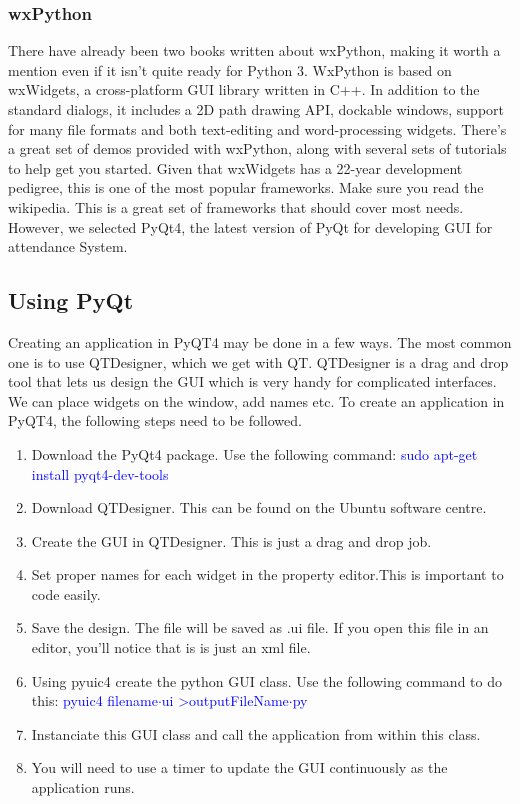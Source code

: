 \documentclass[a4paper,12pt]{article}
\begin{document}
\subsubsection*{wxPython}
There have already been two books written about wxPython, making it worth a mention even if it isn’t quite ready for Python 3.
WxPython is based on wxWidgets, a cross-platform GUI library written in C++. In addition to the standard dialogs, it includes a 
2D path drawing API, dockable windows, support for many file formats and both text-editing and word-processing widgets.
There’s a great set of demos provided with wxPython, along with several sets of tutorials to help get you started. Given that 
wxWidgets has a 22-year development pedigree, this is one of the most popular frameworks. Make sure you read the wikipedia.
This is a great set of frameworks that should cover most needs. However, we selected PyQt4, the latest version of PyQt for 
developing GUI for attendance System.

\subsection{Using PyQt}
Creating an application in PyQT4 may be done in a few ways. The most common one is to use QTDesigner, which we get with QT. 
QTDesigner is a drag and drop tool that lets us design the GUI which is very handy for complicated interfaces. We can place widgets on 
the window, add names etc. To create an application in PyQT4, the following steps need to be followed.


\begin{enumerate}
	\item Download the PyQt4 package. Use the following command:
	 \newline \textcolor{blue}{sudo apt-get install pyqt4-dev-tools}
	\item Download QTDesigner. This can be found on the Ubuntu software centre.
	\item Create the GUI in QTDesigner. This is just a drag and drop job.   
	\item Set proper names for each widget in the property editor.This is important to code easily.
	\item Save the design. The file will be saved as .ui file. If you open this file in an editor, you'll notice that is 
	 is just an xml file.
	\item Using pyuic4 create the python GUI class. Use the following command to do this:
	 \newline \textcolor{blue}{pyuic4 filename$\cdot$ui \textgreater  outputFileName$\cdot$py}
	\item Instanciate this GUI class and call the application from within this class.
	\item You will need to use a timer to update the GUI continuously as the application runs.
\end{enumerate}
\end{document}
